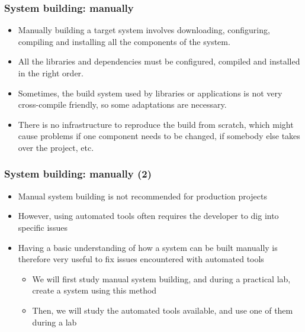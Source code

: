 \begin{frame}
  \frametitle{System building: manually}
  \begin{itemize}
  \item Manually building a target system involves downloading,
    configuring, compiling and installing all the components of the
    system.
  \item All the libraries and dependencies must be configured,
    compiled and installed in the right order.
  \item Sometimes, the build system used by libraries or applications
    is not very cross-compile friendly, so some adaptations are
    necessary.
  \item There is no infrastructure to reproduce the build from
    scratch, which might cause problems if one component needs to be
    changed, if somebody else takes over the project, etc.
  \end{itemize}
\end{frame}

\begin{frame}
  \frametitle{System building: manually (2)}
  \begin{itemize}
  \item Manual system building is not recommended for production
    projects
  \item However, using automated tools often requires the developer to
    dig into specific issues
  \item Having a basic understanding of how a system can be built
    manually is therefore very useful to fix issues encountered with
    automated tools
    \begin{itemize}
    \item We will first study manual system building, and during a
      practical lab, create a system using this method
    \item Then, we will study the automated tools available, and use
      one of them during a lab
    \end{itemize}
  \end{itemize}
\end{frame}

